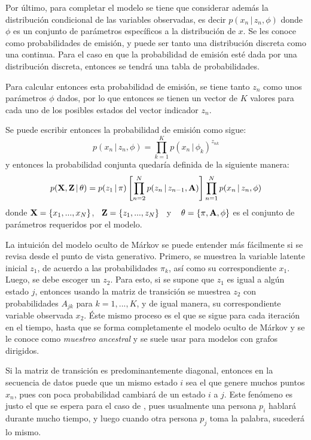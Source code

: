 Por último, para completar el modelo se tiene que considerar además la distribución condicional de las variables observadas, es decir $p(x_n \,|\, z_n, \phi)$ donde $\phi$ es un conjunto de parámetros específicos a la distribución de $x$. Se les conoce como probabilidades de emisión, y puede ser tanto una distribución discreta como una continua. Para el caso en que la probabilidad de emisión esté dada por una distribución discreta, entonces se tendrá una tabla de probabilidades.

Para calcular entonces esta probabilidad de emisión, se tiene tanto $z_n$ como unos parámetros $\phi$ dados, por lo que entonces se tienen un vector de $K$ valores para cada uno de los posibles estados del vector indicador $z_n$.

Se puede escribir entonces la probabilidad de emisión como sigue:
\begin{equation}
p(x_n \,|\, z_n, \phi) = \prod_{k=1}^K p(x_n \,|\, \phi_k) ^ {z_{nk}}
\label{eqn:2-10}
\end{equation}
y entonces la probabilidad conjunta quedaría definida de la siguiente manera:
\begin{equation}
p(\textbf{X}, \textbf{Z} \,|\, \theta) 
= p(z_1 \,|\, \pi) \left[ \prod_{n=2}^N p(z_n \,|\, z_{n-1}, \textbf{A}) \right]
        \prod_{n=1}^N p(x_n \,|\, z_n, \phi)
\label{eqn:2-11}
\end{equation}
donde $\textbf{X} = \lbrace x_1, ..., x_N \rbrace$,~ $\textbf{Z} = \lbrace z_1, ..., z_N \rbrace$~ y ~ $\theta = \lbrace \pi, \textbf{A}, \phi \rbrace$ es el conjunto de parámetros requeridos por el modelo.

La intuición del modelo oculto de Márkov se puede entender más fácilmente si se revisa desde el punto de vista generativo. Primero, se muestrea la variable latente inicial $z_1$, de acuerdo a las probabilidades $\pi_k$, así como su correspondiente $x_1$. Luego, se debe escoger un $z_2$. Para esto, si se supone que $z_1$ es igual a algún estado $j$, entonces usando la matriz de transición se muestrea $z_2$ con probabilidades $A_{jk}$ para $k = 1, ..., K$, y de igual manera, su correspondiente variable observada $x_2$. Éste mismo proceso es el que se sigue para cada iteración en el tiempo, hasta que se forma completamente el modelo oculto de Márkov y se le conoce como \textit{muestreo ancestral} y se suele usar para modelos con grafos dirigidos.

Si la matriz de transición es predominantemente diagonal, entonces en la secuencia de datos puede que un mismo estado $i$ sea el que genere muchos puntos $x_n$, pues con poca probabilidad cambiará de un estado $i$ a $j$. Este fenómeno es justo el que se espera para el caso de \sd, pues usualmente una persona $p_i$ hablará durante mucho tiempo, y luego cuando otra persona $p_j$ toma la palabra, sucederá lo mismo.